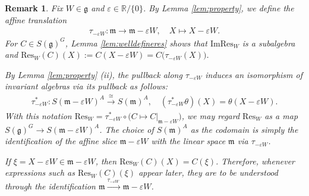 \documentclass[11pt]{amsart}
\theoremstyle{definition}
\theoremstyle{plain}
\newtheorem{remark}[theorem]{Remark}
\theoremstyle{conclusion}
\begin{document}
 \begin{remark}
\label{rem:ResW}
Fix $W \in \mathfrak{g}$ and $\varepsilon\in\mathbb{R}/\{0\}$. By Lemma \ref{lem:property}, we define the affine translation \begin{align*}
\tau_{-\varepsilon W} : \mathfrak{m} \longrightarrow \mathfrak{m}-\varepsilon W,\quad X\longmapsto X-\varepsilon W .
\end{align*} For $C\in S(\mathfrak{g})^G$, Lemma \ref{lem:welldefineres} shows that $\mathrm{Im Res}_W$ is a subalgebra and   $  \mathrm{Res}_W(C)(X):=C(X-\varepsilon W)=C\big(\tau_{-\varepsilon W}(X)\big)$.
 

By Lemma \ref{lem:property} (ii), the pullback along $\tau_{-\varepsilon W}$ induces an isomorphism of invariant algebras via its pullback as follows:
\begin{align*}
\tau_{-\varepsilon W}^* : S(\mathfrak{m}-\varepsilon W)^A  \xrightarrow{\ \cong\ } S(\mathfrak{m})^A,\quad (\tau_{-\varepsilon W}^*\theta)(X)=\theta(X-\varepsilon W).
\end{align*} With this notation $\mathrm{Res}_W = \tau_{-\varepsilon W}^*\circ \big(C\mapsto C\vert_{\mathfrak{m}-\varepsilon W}\big)$,  we may regard $\mathrm{Res}_W$ as a map $S(\mathfrak{g})^G\to S(\mathfrak{m}-\varepsilon W)^A$. The choice of $S(\mathfrak{m})^A$ as the codomain is simply the identification of the affine slice $\mathfrak{m}-\varepsilon W$ with the linear space $\mathfrak{m}$ via $\tau_{-\varepsilon W}$.

 If $\xi=X-\varepsilon W\in\mathfrak{m}-\varepsilon W$, then $\mathrm{Res}_W(C)(X)=C(\xi)$. Therefore, whenever expressions such as $\mathrm{Res}_W(C)(\xi)$ appear later, they are to be understood through the identification $\mathfrak{m}\xrightarrow{ \tau_{-\varepsilon W}\ } \mathfrak{m}-\varepsilon W$.
\end{remark}
\end{document}
